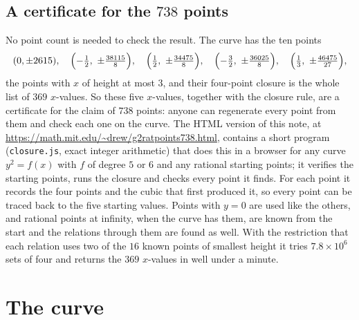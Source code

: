 \documentclass[11pt]{article}
\theoremstyle{remark}
\begin{document}
\subsection*{A certificate for the $738$ points}
No point count is needed to check the result.  The curve has the ten points
\[
(0,\pm 2615),\quad \Bigl(-\tfrac12,\ \pm\tfrac{38115}{8}\Bigr),\quad \Bigl(\tfrac12,\ \pm\tfrac{34475}{8}\Bigr),\quad
\Bigl(-\tfrac32,\ \pm\tfrac{36025}{8}\Bigr),\quad \Bigl(\tfrac13,\ \pm\tfrac{46475}{27}\Bigr),
\]
the points with $x$ of height at most $3$, and their four-point closure is the whole list of $369$ $x$-values.  So these five
$x$-values, together with the closure rule, are a certificate for the claim of $738$ points: anyone can regenerate every point from
them and check each one on the curve.  The HTML version of this note, at \url{https://math.mit.edu/~drew/g2ratpoints738.html}, contains a short program
(\texttt{closure.js}, exact integer arithmetic) that does this in a browser for any curve $y^2=f(x)$ with $f$ of degree $5$ or $6$
and any rational starting points; it verifies the starting points, runs the closure and checks every point it finds.  For each
point it records the four points and the cubic that first produced it, so every point can be traced back to the five starting
values.  Points with $y=0$ are used like the others, and
rational points at infinity, when the curve has them, are known from the start and the relations through them are found as well.  With the restriction that each relation uses two of the $16$ known points of smallest height it
tries $7.8\times10^6$ sets of four and returns the $369$ $x$-values in well under a minute.

\section{The curve}\label{sec:curve}
\end{document}
